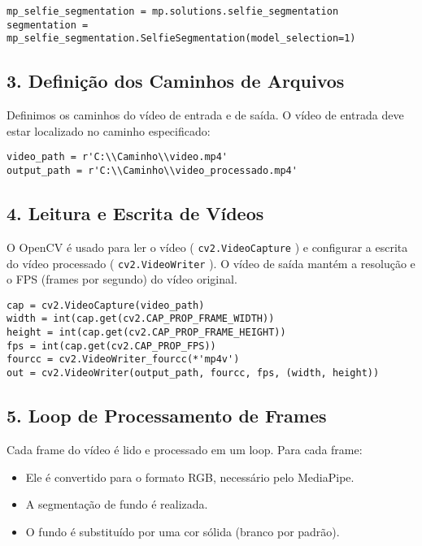 \documentclass{article}%
\begin{document}
\begin{verbatim}
mp_selfie_segmentation = mp.solutions.selfie_segmentation
segmentation = mp_selfie_segmentation.SelfieSegmentation(model_selection=1)
\end{verbatim}

%
\subsection{3. Definição dos Caminhos de Arquivos}%
\label{subsec:3.DefiniodosCaminhosdeArquivos}%
Definimos os caminhos do vídeo de entrada e de saída. O vídeo de entrada deve estar localizado no caminho especificado:%

\begin{verbatim}
video_path = r'C:\\Caminho\\video.mp4'
output_path = r'C:\\Caminho\\video_processado.mp4'
\end{verbatim}

%
\subsection{4. Leitura e Escrita de Vídeos}%
\label{subsec:4.LeituraeEscritadeVdeos}%
O OpenCV é usado para ler o vídeo (%
\texttt{cv2.VideoCapture}%
) e configurar a escrita do vídeo processado (%
\texttt{cv2.VideoWriter}%
). O vídeo de saída mantém a resolução e o FPS (frames por segundo) do vídeo original.%

\begin{verbatim}
cap = cv2.VideoCapture(video_path)
width = int(cap.get(cv2.CAP_PROP_FRAME_WIDTH))
height = int(cap.get(cv2.CAP_PROP_FRAME_HEIGHT))
fps = int(cap.get(cv2.CAP_PROP_FPS))
fourcc = cv2.VideoWriter_fourcc(*'mp4v')
out = cv2.VideoWriter(output_path, fourcc, fps, (width, height))
\end{verbatim}

%
\subsection{5. Loop de Processamento de Frames}%
\label{subsec:5.LoopdeProcessamentodeFrames}%
Cada frame do vídeo é lido e processado em um loop. Para cada frame:%
\begin{itemize}%
\item%
Ele é convertido para o formato RGB, necessário pelo MediaPipe.%
\item%
A segmentação de fundo é realizada.%
\item%
O fundo é substituído por uma cor sólida (branco por padrão).%
\end{itemize}%
\end{document}
